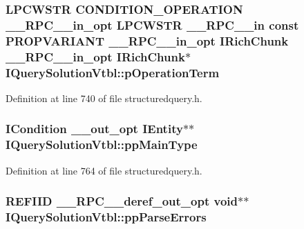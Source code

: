 \subsubsection[{\texorpdfstring{p\+Operation\+Term}{pOperationTerm}}]{ {\bf L\+P\+C\+W\+S\+TR} {\bf C\+O\+N\+D\+I\+T\+I\+O\+N\+\_\+\+O\+P\+E\+R\+A\+T\+I\+ON} {\bf \+\_\+\+\_\+\+R\+P\+C\+\_\+\+\_\+in\+\_\+opt} {\bf L\+P\+C\+W\+S\+TR} {\bf \+\_\+\+\_\+\+R\+P\+C\+\_\+\+\_\+in} {\bf const} {\bf P\+R\+O\+P\+V\+A\+R\+I\+A\+NT} {\bf \+\_\+\+\_\+\+R\+P\+C\+\_\+\+\_\+in\+\_\+opt} {\bf I\+Rich\+Chunk} {\bf \+\_\+\+\_\+\+R\+P\+C\+\_\+\+\_\+in\+\_\+opt} {\bf I\+Rich\+Chunk}$\ast$ I\+Query\+Solution\+Vtbl\+::p\+Operation\+Term}\hypertarget{struct_i_query_solution_vtbl_a1f82414cc889f48e10a6d76be2882c5b}{}\label{struct_i_query_solution_vtbl_a1f82414cc889f48e10a6d76be2882c5b}


Definition at line 740 of file structuredquery.\+h.

\subsubsection[{\texorpdfstring{pp\+Main\+Type}{ppMainType}}]{ {\bf I\+Condition} {\bf \+\_\+\+\_\+out\+\_\+opt} {\bf I\+Entity}$\ast$$\ast$ I\+Query\+Solution\+Vtbl\+::pp\+Main\+Type}\hypertarget{struct_i_query_solution_vtbl_aad7252c971c3f3ca700e50cd98c0c6ac}{}\label{struct_i_query_solution_vtbl_aad7252c971c3f3ca700e50cd98c0c6ac}


Definition at line 764 of file structuredquery.\+h.

\subsubsection[{\texorpdfstring{pp\+Parse\+Errors}{ppParseErrors}}]{ {\bf R\+E\+F\+I\+ID} {\bf \+\_\+\+\_\+\+R\+P\+C\+\_\+\+\_\+deref\+\_\+out\+\_\+opt} {\bf void}$\ast$$\ast$ I\+Query\+Solution\+Vtbl\+::pp\+Parse\+Errors}\hypertarget{struct_i_query_solution_vtbl_a16e19956b4c05122054a25f725b993af}{}\label{struct_i_query_solution_vtbl_a16e19956b4c05122054a25f725b993af}


